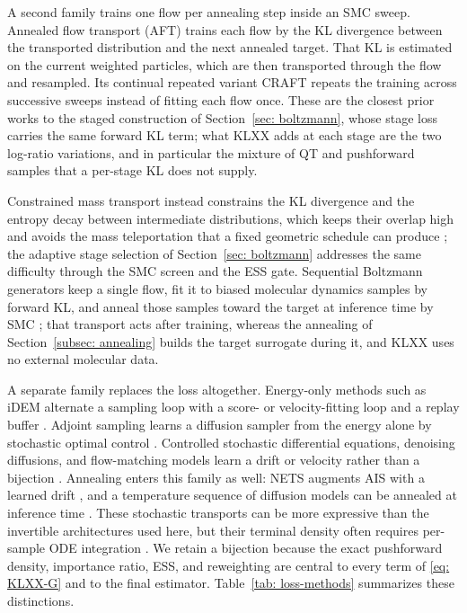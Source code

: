 \documentclass{article}
\begin{document}
A second family trains one flow per annealing step inside an SMC sweep. Annealed flow transport (AFT) \citep{arbel2021annealed} trains each flow by the KL divergence between the transported distribution and the next annealed target. That KL is estimated on the current weighted particles, which are then transported through the flow and resampled. Its continual repeated variant CRAFT \citep{matthews2022craft} repeats the training across successive sweeps instead of fitting each flow once. These are the closest prior works to the staged construction of Section~\ref{sec: boltzmann}, whose stage loss carries the same forward KL term; what KLXX adds at each stage are the two log-ratio variations, and in particular the mixture of QT and pushforward samples that a per-stage KL does not supply.

Constrained mass transport instead constrains the KL divergence and the entropy decay between intermediate distributions, which keeps their overlap high and avoids the mass teleportation that a fixed geometric schedule can produce \citep{vonklitzing2026constrained}; the adaptive stage selection of Section~\ref{sec: boltzmann} addresses the same difficulty through the SMC screen and the ESS gate. Sequential Boltzmann generators keep a single flow, fit it to biased molecular dynamics samples by forward KL, and anneal those samples toward the target at inference time by SMC \citep{tan2025sequential}; that transport acts after training, whereas the annealing of Section~\ref{subsec: annealing} builds the target surrogate during it, and KLXX uses no external molecular data.

A separate family replaces the loss altogether. Energy-only methods such as iDEM alternate a sampling loop with a score- or velocity-fitting loop and a replay buffer \citep{akhound2024iterated,woo2024iefm}. Adjoint sampling learns a diffusion sampler from the energy alone by stochastic optimal control \citep{havens2025adjoint}. Controlled stochastic differential equations, denoising diffusions, and flow-matching models learn a drift or velocity rather than a bijection \citep{zhang2022path,vargas2023denoising,berner2024optimal,nusken2021solving,richter2024improved}. Annealing enters this family as well: NETS augments AIS with a learned drift \citep{albergo2024nets}, and a temperature sequence of diffusion models can be annealed at inference time \citep{akhoundsadegh2025progressive}. These stochastic transports can be more expressive than the invertible architectures used here, but their terminal density often requires per-sample ODE integration \citep{he2025notrick}. We retain a bijection because the exact pushforward density, importance ratio, ESS, and reweighting are central to every term of \eqref{eq: KLXX-G} and to the final estimator. Table~\ref{tab: loss-methods} summarizes these distinctions.
\end{document}
